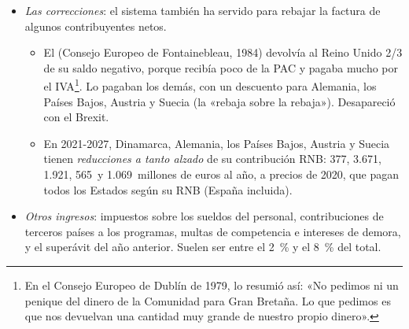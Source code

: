 \documentclass[11pt]{article}
\begin{document}
\begin{itemize}
\begin{enumerate}
  \item {} (desde 1979, cuando se armonizó la base): un tipo de referencia del \emph{0,30~\%} sobre una base de IVA armonizada (la recaudación dividida por el tipo medio ponderado), que no puede pasar del \emph{50~\% de la RNB} de cada Estado, para no castigar a los países de consumo alto y renta baja\nocite{UE2020DRP}. Fueron 23.900~millones, el 15~\%.
  \item {} (desde 1988): un tipo uniforme sobre la RNB de cada Estado, que se fija cada año para cerrar el presupuesto\nocite{UE2020DRP}. Nació como recurso de cierre y hoy es el principal, con 101.700~millones en 2025, el 65~\% de los recursos propios (y más de 2/3 en el presupuesto de 2026). Es el más justo con la capacidad de pago, porque es proporcional a la renta, pero el menos «propio»: es una contribución nacional con otro nombre.
  \item {} (desde 2021): \emph{0,80 euros por kilo} de residuos de envases de plástico no reciclados, con una rebaja a tanto alzado para los Estados con RNB per cápita inferior a la media\nocite{UE2020DRP}. Fueron 6.900~millones, el 4~\%. Tiene un doble dividendo: recauda y anima a reciclar.
  \end{enumerate}
\item \emph{Las correcciones}: el sistema también ha servido para rebajar la factura de algunos contribuyentes netos.
  \begin{itemize}
  \item El  (Consejo Europeo de Fontainebleau, 1984) devolvía al Reino Unido 2/3 de su saldo negativo, porque recibía poco de la PAC y pagaba mucho por el IVA\footnote{En el Consejo Europeo de Dublín de 1979,  lo resumió así: «No pedimos ni un penique del dinero de la Comunidad para Gran Bretaña. Lo que pedimos es que nos devuelvan una cantidad muy grande de nuestro propio dinero».}. Lo pagaban los demás, con un descuento para Alemania, los Países Bajos, Austria y Suecia (la «rebaja sobre la rebaja»). Desapareció con el Brexit.
  \item En 2021-2027, Dinamarca, Alemania, los Países Bajos, Austria y Suecia tienen \emph{reducciones a tanto alzado} de su contribución RNB: 377, 3.671, 1.921, 565~y 1.069~millones de euros al año, a precios de 2020, que pagan todos los Estados según su RNB (España incluida)\nocite{UE2020DRP}.
  \end{itemize}
\item \emph{Otros ingresos}: impuestos sobre los sueldos del personal, contribuciones de terceros países a los programas, multas de competencia e intereses de demora, y el superávit del año anterior. Suelen ser entre el 2~\% y el 8~\% del total.

\end{itemize}
\end{document}
